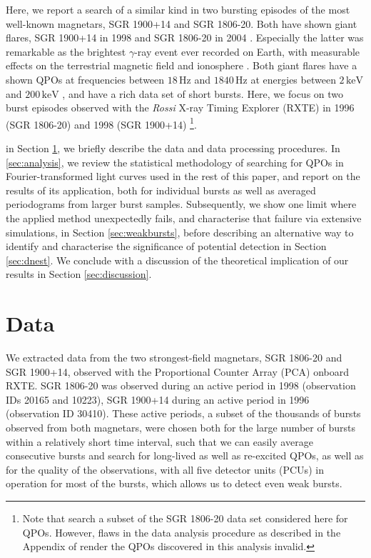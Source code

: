 \documentclass[numberedappendix]{emulateapj}
\newcommand{\hz}{\,\mathrm{Hz}}
\begin{document}
Here, we report a search of a similar kind in two bursting episodes of the most well-known magnetars, SGR 1900+14 and SGR 1806-20. Both have shown giant flares, SGR 1900+14 in 1998 \citep{cline1998,hurley1999,feroci1999} and SGR 1806-20 in 2004 \citep{palmer2005,hurley2004,hurley2005,mazets2005,borkowski2004,mereghetti2005,cameron2005}. Especially the latter was remarkable as the brightest $\gamma$-ray event ever recorded on Earth, with measurable effects on the terrestrial magnetic field and ionosphere \citep{mandea2006,inan2007}. Both giant flares have a shown QPOs at frequencies between $18\hz$ and $1840\hz$ at energies between $2 \, \mathrm{keV}$ and $200 \, \mathrm{keV}$ \citep{strohmayer2005,israel2005,strohmayer2006,watts2006}, and have a rich data set of short bursts.
Here, we focus on two burst episodes observed with the {\it Rossi} X-ray Timing Explorer (RXTE) in 1996 (SGR 1806-20) \citep{gogus2000} and 1998 (SGR 1900+14) \citep{gogus1999} \footnote{Note that \citet{elmezeini2010} search a subset of the SGR 1806-20 data set considered here for QPOs. However, flaws in the data analysis procedure as described in the Appendix of \citet{huppenkothen2013} render the QPOs discovered in this analysis invalid.}. 

in Section \ref{sec:data}, we briefly describe the data and data processing procedures. In \ref{sec:analysis}, we review the statistical methodology of searching for QPOs in Fourier-transformed light curves used in the rest of this paper, and report on the results of its application, both for individual bursts as well as averaged periodograms from larger burst samples. Subsequently, we show one limit where the applied method unexpectedly fails, and characterise that failure via extensive simulations, in Section \ref{sec:weakbursts}, before describing an alternative way to identify and characterise the significance of potential detection in Section \ref{sec:dnest}. We conclude with a discussion of the theoretical implication of our results in Section \ref{sec:discussion}.


\section{Data}
\label{sec:data}

We extracted data from the two strongest-field magnetars, SGR 1806-20 and SGR 1900+14, observed with the Proportional Counter Array (PCA) onboard RXTE. SGR 1806-20 was observed during an active period in 1998 (observation IDs 20165 and 10223), SGR 1900+14 during an active period in 1996 (observation ID 30410). These active periods, a subset of the thousands of bursts observed from both magnetars, were chosen both for the large number of bursts within a relatively short time interval, such that we can easily average consecutive bursts and search for long-lived as well as re-excited QPOs, as well as for the quality of the observations, with all five detector units (PCUs) in operation for most of the bursts, which allows us to detect even weak bursts.
\end{document}

